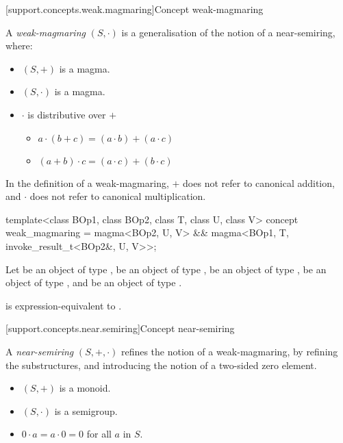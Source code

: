 [support.concepts.weak.magmaring]{Concept weak-magmaring}

\pnum
A \textit{weak-magmaring} $(S, \cdot)$ is a generalisation of the notion of a near-semiring, where:
\begin{itemize}
   \item $(S, +)$ is a magma.
   \item $(S, \cdot)$ is a magma.
   \item $\cdot$ is distributive over $+$
   \begin{itemize}
      \item $a \cdot (b + c) = (a \cdot b) + (a \cdot c)$
      \item $(a + b) \cdot c = (a \cdot c) + (b \cdot c)$
   \end{itemize}
\end{itemize}
\begin{note}
   In the definition of a weak-magmaring, $+$ does not refer to canonical addition, and $\cdot$ does
   not refer to canonical multiplication.
\end{note}

\begin{itemdecl}
  template<class BOp1, class BOp2, class T, class U, class V>
  concept weak_magmaring = magma<BOp2, U, V> && magma<BOp1, T, invoke_result_t<BOp2&, U, V>>;
\end{itemdecl}
\begin{itemdescr}
   \pnum
   Let  be an object of type ,  be an object of type
   ,  be an object of type ,  be an object of type ,
   and  be an object of type .

   \pnum
    is expression-equivalent to
   .
\end{itemdescr}


[support.concepts.near.semiring]{Concept near-semiring}

\pnum
A \textit{near-semiring} $(S, +, \cdot)$ refines the notion of a weak-magmaring, by refining the
substructures, and introducing the notion of a two-sided zero element.
\begin{itemize}
   \item $(S, +)$ is a monoid.
   \item $(S, \cdot)$ is a semigroup.
   \item $0 \cdot a = a \cdot 0 = 0$ for all $a$ in $S$.
\end{itemize}

